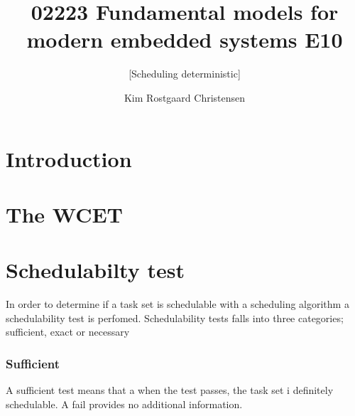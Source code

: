 \documentclass{acm_proc_article-sp}
\begin{document}
\title{02223 Fundamental models for modern embedded systems E10}
\subtitle{[Scheduling deterministic]
}

\author{
\alignauthor 
Kim Rostgaard Christensen\\
}

\maketitle

\begin{abstract}
\end{abstract}




\section{Introduction}



\section{The WCET}




\section{Schedulabilty test}
In order to determine if a task set is schedulable with a scheduling algorithm a schedulability test is perfomed.
Schedulability tests falls into three categories; sufficient, exact or necessary
\subsubsection*{Sufficient}
A sufficient test means that a when the test passes, the task set i definitely schedulable. A fail provides no additional information.	
\end{document}
